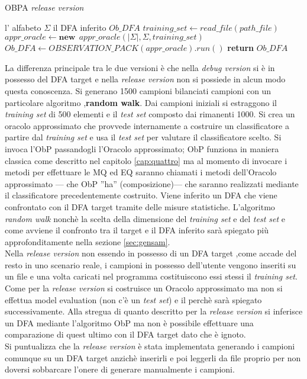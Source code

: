 \begin{algorithm}
\caption{OBPA \textit{release version}}\label{alg:obpar}
\begin{algorithmic}[1]
\Statex
\Input l' alfabeto $\Sigma$
\Output il \ac{DFA} inferito $Ob\_DFA$
\State $training\_set \gets read\_file(path\_file)$ 
\State $appr\_oracle \gets \textbf{new}\:\: appr\_oracle(|\Sigma|,\Sigma,training\_set)$
\State $Ob\_DFA \gets OBSERVATION\_PACK(appr\_oracle).run()$
 \State \textbf{return} $Ob\_DFA$
     
\end{algorithmic}
\end{algorithm}

La differenza principale tra le due versioni è che nella \textit{debug version} si è in possesso del \ac{DFA} target e nella \textit{release version} non si possiede in alcun modo questa conoscenza.  Si generano 1500 campioni bilanciati campioni con un particolare algoritmo ,\textbf{random walk}.  Dai campioni iniziali si estraggono il \textit{training set} di 500 elementi e il \textit{test set} composto dai rimanenti 1000. Si crea un oracolo approssimato che provvede internamente a costruire un classificatore a partire dal \textit{training set} e usa il \textit{test set} per valutare il classificatore scelto. Si invoca l'\ac{ObP} passandogli l'Oracolo approssimato; \ac{ObP} funziona in maniera classica come descritto nel capitolo \ref{cap:quattro} ma al momento di invocare i metodi per effettuare le \ac{MQ} ed \ac{EQ} saranno chiamati i metodi dell'Oracolo approssimato --- che \ac{ObP} ''ha'' (composizione)--- che saranno realizzati mediante il classificatore precedentemente costruito. Viene inferito un \ac{DFA} che viene confrontato con il \ac{DFA} target tramite delle misure statistiche.  L'algoritmo \textit{random walk} nonchè la scelta della dimensione del \textit{training set} e del \textit{test set}  e come avviene il confronto tra il target e il \ac{DFA} inferito sarà spiegato più approfonditamente nella sezione \ref{sec:gensam}.\\
Nella \textit{release version} non essendo in possesso di un \ac{DFA} target ,come accade del resto in uno scenario reale, i campioni in possesso dell'utente vengono inseriti su un file e una volta caricati nel programma costituiscono essi stessi il \textit{training set}. Come per la \textit{release version} si costruisce un Oracolo approssimato ma non si effettua model evaluation (non c'è un \textit{test set}) e il perchè sarà spiegato successivamente. Alla stregua di quanto descritto per la \textit{release version} si inferisce un \ac{DFA} mediante l'algoritmo \ac{ObP} ma non è possibile effettuare una comparazione di quest ultimo con il \ac{DFA} target dato che è ignoto. \\
Si puntualizza che la \textit{release version} è stata implementata generando i campioni comunque su un \ac{DFA} target anzichè inserirli e poi leggerli da file proprio per non doversi sobbarcare  l'onere di generare manualmente i campioni. 

